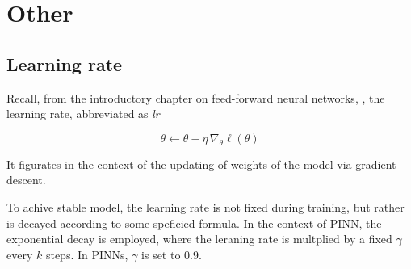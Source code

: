 \section{Other}

%
%
%

\subsection{Learning rate}
Recall, from the introductory chapter on feed-forward neural networks,
, the learning rate, abbreviated as \emph{lr}

$$
\theta \leftarrow \theta - \eta\, \nabla_\theta \ell(\theta)
$$

It figurates in the context of the updating of weights of the model via gradient descent.

To achive stable model, the learning rate is not fixed during training, but rather is
decayed according to some speficied formula.
In the context of PINN, the exponential decay is employed, where the leraning rate is multplied by a fixed $\gamma$
every $k$ steps. In PINNs, $\gamma$ is set to 0.9.




